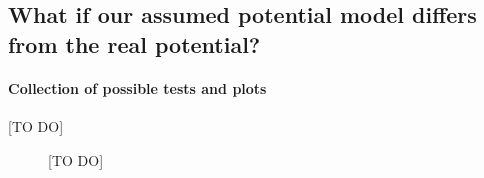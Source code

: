 \subsection{What if our assumed potential model differs from the real potential?}

\paragraph{Collection of possible tests and plots}

[TO DO]


\begin{figure}
\caption{[TO DO]}
\end{figure}





